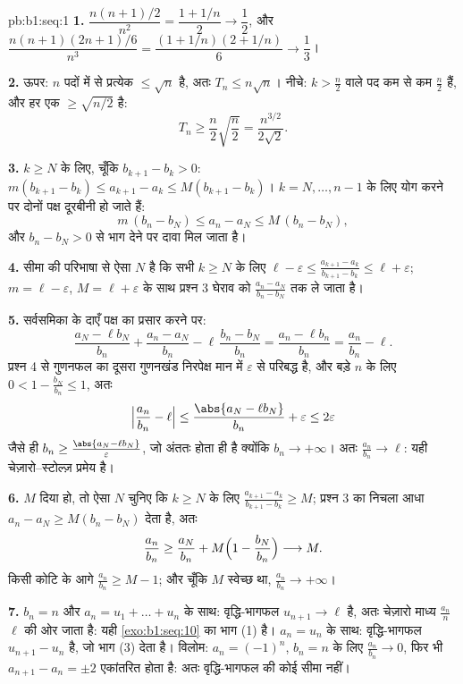 \begin{solution}{pb:b1:seq:1}
\textbf{1.} $\dfrac{n(n+1)/2}{n^2} = \dfrac{1 + 1/n}{2} \to \dfrac12$, और
$\dfrac{n(n+1)(2n+1)/6}{n^3} = \dfrac{(1 + 1/n)(2 + 1/n)}{6} \to \dfrac13$।

\textbf{2.} ऊपर: $n$ पदों में से प्रत्येक $\leq \sqrt n$ है, अतः $T_n \leq
n\sqrt n$। नीचे: $k > \frac n2$ वाले पद कम से कम $\frac n2$ हैं, और हर एक
$\geq \sqrt{n/2}$ है:
\[
T_n \geq \frac n2 \sqrt{\frac n2} = \frac{n^{3/2}}{2\sqrt 2} .
\]

\textbf{3.} $k \geq N$ के लिए, चूँकि $b_{k+1} - b_k > 0$: $m(b_{k+1} - b_k)
\leq a_{k+1} - a_k \leq M(b_{k+1} - b_k)$। $k = N, \dots, n - 1$ के लिए योग
करने पर दोनों पक्ष दूरबीनी हो जाते हैं:
\[
m\,(b_n - b_N) \leq a_n - a_N \leq M\,(b_n - b_N),
\]
और $b_n - b_N > 0$ से भाग देने पर दावा मिल जाता है।

\textbf{4.} सीमा की परिभाषा से ऐसा $N$ है कि सभी $k \geq N$ के लिए $\ell -
\varepsilon \leq \frac{a_{k+1} - a_k}{b_{k+1} - b_k} \leq \ell +
\varepsilon$; $m = \ell - \varepsilon$, $M = \ell + \varepsilon$ के साथ
प्रश्न 3 घेराव को $\frac{a_n - a_N}{b_n - b_N}$ तक ले जाता है।

\textbf{5.} सर्वसमिका के दाएँ पक्ष का प्रसार करने पर:
\[
\frac{a_N - \ell b_N}{b_n} + \frac{a_n - a_N}{b_n} -
\ell\,\frac{b_n - b_N}{b_n}
= \frac{a_n - \ell b_n}{b_n} = \frac{a_n}{b_n} - \ell .
\]
प्रश्न 4 से गुणनफल का दूसरा गुणनखंड निरपेक्ष मान में $\varepsilon$ से
परिबद्ध है, और बड़े $n$ के लिए $0 < 1 - \frac{b_N}{b_n} \leq 1$, अतः
\[
\Bigl|\frac{a_n}{b_n} - \ell\Bigr|
\leq \frac{\abs{a_N - \ell b_N}}{b_n} + \varepsilon
\leq 2\varepsilon
\]
जैसे ही $b_n \geq \frac{\abs{a_N - \ell b_N}}{\varepsilon}$, जो अंततः होता
ही है क्योंकि $b_n \to +\infty$। अतः $\frac{a_n}{b_n} \to \ell$: यही
चेज़ारो--स्टोल्ज़ प्रमेय है।

\textbf{6.} $M$ दिया हो, तो ऐसा $N$ चुनिए कि $k \geq N$ के लिए
$\frac{a_{k+1} - a_k}{b_{k+1} - b_k} \geq M$; प्रश्न 3 का निचला आधा $a_n -
a_N \geq M(b_n - b_N)$ देता है, अतः
\[
\frac{a_n}{b_n} \geq \frac{a_N}{b_n} +
M\Bigl(1 - \frac{b_N}{b_n}\Bigr) \longrightarrow M .
\]
किसी कोटि के आगे $\frac{a_n}{b_n} \geq M - 1$; और चूँकि $M$ स्वेच्छ था,
$\frac{a_n}{b_n} \to +\infty$।

\textbf{7.} $b_n = n$ और $a_n = u_1 + \dots + u_n$ के साथ: वृद्धि-भागफल
$u_{n+1} \to \ell$ है, अतः चेज़ारो माध्य $\frac{a_n}{n}$ $\ell$ की ओर जाता
है: यही \cref{exo:b1:seq:10} का भाग (1) है। $a_n = u_n$ के साथ: वृद्धि-भागफल
$u_{n+1} - u_n$ है, जो भाग (3) देता है। विलोम: $a_n = (-1)^n$, $b_n = n$ के
लिए $\frac{a_n}{b_n} \to 0$, फिर भी $a_{n+1} - a_n = \pm 2$ एकांतरित होता
है: अतः वृद्धि-भागफल की कोई सीमा नहीं।


\end{solution}
